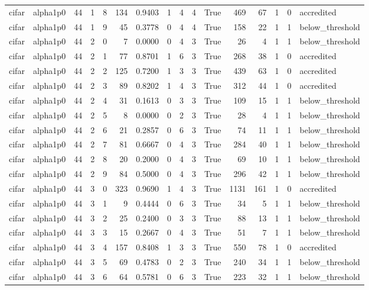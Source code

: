 \begin{tabular}{llrrrrrrrrrrrrrl}
cifar & alpha1p0 & 44 & 1 & 8 & 134 & 0.9403 & 1 & 4 & 4 & True & 469 & 67 & 1 & 0 & accredited \\
cifar & alpha1p0 & 44 & 1 & 9 & 45 & 0.3778 & 0 & 4 & 4 & True & 158 & 22 & 1 & 1 & below\_threshold \\
cifar & alpha1p0 & 44 & 2 & 0 & 7 & 0.0000 & 0 & 4 & 3 & True & 26 & 4 & 1 & 1 & below\_threshold \\
cifar & alpha1p0 & 44 & 2 & 1 & 77 & 0.8701 & 1 & 6 & 3 & True & 268 & 38 & 1 & 0 & accredited \\
cifar & alpha1p0 & 44 & 2 & 2 & 125 & 0.7200 & 1 & 3 & 3 & True & 439 & 63 & 1 & 0 & accredited \\
cifar & alpha1p0 & 44 & 2 & 3 & 89 & 0.8202 & 1 & 4 & 3 & True & 312 & 44 & 1 & 0 & accredited \\
cifar & alpha1p0 & 44 & 2 & 4 & 31 & 0.1613 & 0 & 3 & 3 & True & 109 & 15 & 1 & 1 & below\_threshold \\
cifar & alpha1p0 & 44 & 2 & 5 & 8 & 0.0000 & 0 & 2 & 3 & True & 28 & 4 & 1 & 1 & below\_threshold \\
cifar & alpha1p0 & 44 & 2 & 6 & 21 & 0.2857 & 0 & 6 & 3 & True & 74 & 11 & 1 & 1 & below\_threshold \\
cifar & alpha1p0 & 44 & 2 & 7 & 81 & 0.6667 & 0 & 4 & 3 & True & 284 & 40 & 1 & 1 & below\_threshold \\
cifar & alpha1p0 & 44 & 2 & 8 & 20 & 0.2000 & 0 & 4 & 3 & True & 69 & 10 & 1 & 1 & below\_threshold \\
cifar & alpha1p0 & 44 & 2 & 9 & 84 & 0.5000 & 0 & 4 & 3 & True & 296 & 42 & 1 & 1 & below\_threshold \\
cifar & alpha1p0 & 44 & 3 & 0 & 323 & 0.9690 & 1 & 4 & 3 & True & 1131 & 161 & 1 & 0 & accredited \\
cifar & alpha1p0 & 44 & 3 & 1 & 9 & 0.4444 & 0 & 6 & 3 & True & 34 & 5 & 1 & 1 & below\_threshold \\
cifar & alpha1p0 & 44 & 3 & 2 & 25 & 0.2400 & 0 & 3 & 3 & True & 88 & 13 & 1 & 1 & below\_threshold \\
cifar & alpha1p0 & 44 & 3 & 3 & 15 & 0.2667 & 0 & 4 & 3 & True & 51 & 7 & 1 & 1 & below\_threshold \\
cifar & alpha1p0 & 44 & 3 & 4 & 157 & 0.8408 & 1 & 3 & 3 & True & 550 & 78 & 1 & 0 & accredited \\
cifar & alpha1p0 & 44 & 3 & 5 & 69 & 0.4783 & 0 & 2 & 3 & True & 240 & 34 & 1 & 1 & below\_threshold \\
cifar & alpha1p0 & 44 & 3 & 6 & 64 & 0.5781 & 0 & 6 & 3 & True & 223 & 32 & 1 & 1 & below\_threshold \\

\end{tabular}
